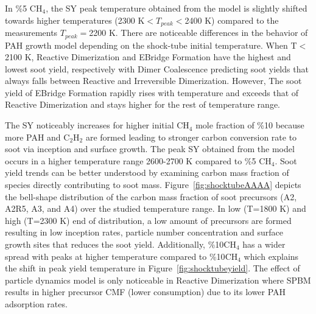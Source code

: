 In \%5 $\mathrm{CH_4}$, the SY peak temperature obtained from the model is slightly shifted towards higher temperatures (2300 K$<T_{peak}<$2400 K) compared to the measurements $T_{peak}=$2200 K. There are noticeable differences in the behavior of PAH growth model depending on the shock-tube initial temperature. When T$<$2100 K, Reactive Dimerization and EBridge Formation have the highest and lowest soot yield, respectively with Dimer Coalescence predicting soot yields that always falls between Reactive and Irreversible Dimerization. However, The soot yield of EBridge Formation rapidly rises with temperature and exceeds that of Reactive Dimerization and stays higher for the rest of temperature range.

The SY noticeably increases for higher initial $\mathrm{CH_4}$ mole fraction of \%10 because more PAH and $\mathrm{C_2H_2}$ are formed leading to stronger carbon conversion rate to soot via inception and surface growth. The peak SY obtained from the model occurs in a higher temperature range 2600-2700 K compared to \%5 $\mathrm{CH_4}$. Soot yield trends can be better understood by examining carbon mass fraction of species directly contributing to soot mass. Figure~\ref{fig:shocktubeAAAA} depicts the bell-shape distribution of the carbon mass fraction of soot precursors (A2, A2R5, A3, and A4) over the studied temperature range. In low (T=1800 K) and high (T=2300 K) end of distribution, a low amount of precursors are formed resulting in low inception rates, particle number concentration and surface growth sites that reduces the soot yield. Additionally, \%10$\mathrm{CH_4}$ has a wider spread with peaks at higher temperature compared to \%10$\mathrm{CH_4}$ which explains the shift in peak yield temperature in Figure~\ref{fig:shocktubeyield}. The effect of particle dynamics model is only noticeable in Reactive Dimerization where SPBM results in higher precursor CMF (lower consumption) due to its lower PAH adsorption rates. %


